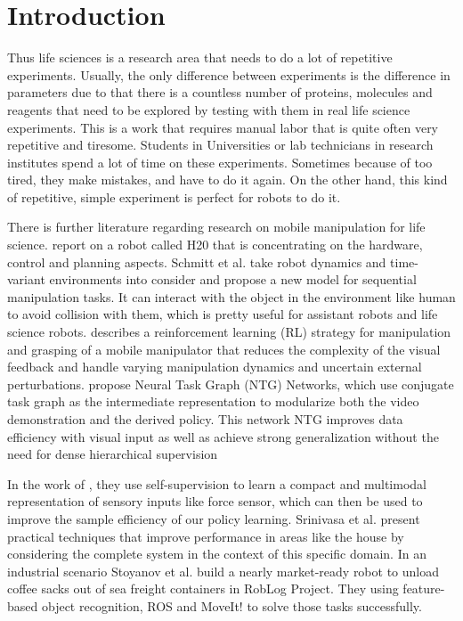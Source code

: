 \documentclass[12pt,draftclsnofoot,onecolumn]{IEEEtran}
\begin{document}
	
	\section{Introduction}
	Thus life sciences is a research area that needs to do a lot of repetitive experiments.
	Usually, the only difference between experiments is the difference in parameters due to that there is a countless number of proteins, molecules and reagents that need to be explored by testing with them in real life science experiments. 
	This is a work that requires manual labor that is quite often very repetitive and tiresome.
	Students in Universities or lab technicians in research institutes spend a lot of time on these experiments.
	Sometimes because of too tired, they make mistakes, and have to do it again.
	On the other hand, this kind of repetitive, simple experiment is perfect for robots to do it.
	
	There is further literature regarding research on mobile manipulation for life science. \cite{ali2016intelligent} report on a robot called H20 that is concentrating on the hardware, control and planning aspects.
	Schmitt et al.\cite{8793824} take robot dynamics and time-variant environments into consider and propose a new model for sequential manipulation tasks. It can interact with the object in the environment like human to avoid collision with them, which is pretty useful for assistant robots and life science robots.
	\cite{7953692}describes a reinforcement learning (RL) strategy for manipulation and grasping of a mobile manipulator that reduces the complexity of the visual feedback and handle varying manipulation dynamics and uncertain external perturbations.
	\cite{huang2019neural} propose Neural Task Graph (NTG) Networks, which use
	conjugate task graph as the intermediate representation to
	modularize both the video demonstration and the derived
	policy. This network NTG improves data efficiency with visual input as well as achieve strong generalization without the need for dense hierarchical supervision
	
	In the work of \cite{lee2018making}, they use self-supervision to learn a compact and multimodal representation of sensory inputs like force sensor, which can then be used to improve the sample efficiency of our policy learning.
	Srinivasa et al.\cite{srinivasa2016system}  present practical techniques that improve performance in areas like the house by considering the complete system in the context of this specific domain.
	In an industrial scenario Stoyanov et al.\cite{stoyanov2016no} build a nearly market-ready robot to unload coffee sacks out of sea freight containers in RobLog Project. They using feature-based object recognition, ROS and MoveIt! to solve those tasks successfully.
	
\end{document}
